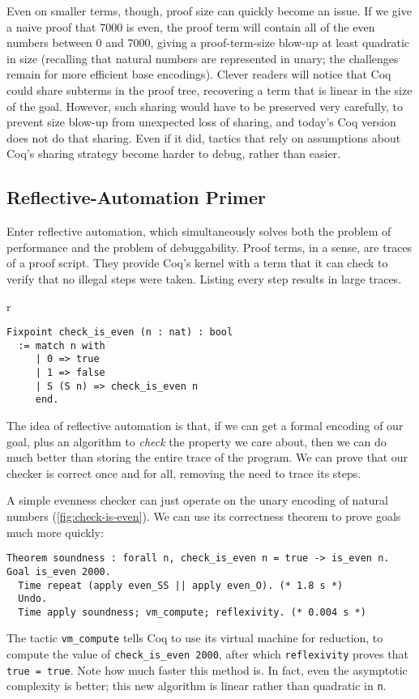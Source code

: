 Even on smaller terms, though, proof size can quickly become an issue.
If we give a naive proof that 7000 is even, the proof term will contain all of the even numbers between 0 and 7000, giving a proof-term-size blow-up at least quadratic in size (recalling that natural numbers are represented in unary; the challenges remain for more efficient base encodings).
Clever readers will notice that Coq could share subterms in the proof tree, recovering a term that is linear in the size of the goal.
However, such sharing would have to be preserved very carefully, to prevent size blow-up from unexpected loss of sharing, and today's Coq version does not do that sharing.
Even if it did, tactics that rely on assumptions about Coq's sharing strategy become harder to debug, rather than easier.

\subsection{Reflective-Automation Primer}\label{sec:evenness}
Enter reflective automation, which simultaneously solves both the problem of performance and the problem of debuggability.
Proof terms, in a sense, are traces of a proof script.
They provide Coq's kernel with a term that it can check to verify that no illegal steps were taken.
Listing every step results in large traces.


\begin{wrapfigure}[9]{r}{}
\begin{verbatim}
Fixpoint check_is_even (n : nat) : bool
  := match n with
     | 0 => true
     | 1 => false
     | S (S n) => check_is_even n
     end.
\end{verbatim}
\caption{Evenness Checking}\label{fig:check-is-even}
\end{wrapfigure}
The idea of reflective automation is that, if we can get a formal encoding of our goal, plus an algorithm to \emph{check} the property we care about, then we can do much better than storing the entire trace of the program.
We can prove that our checker is correct once and for all, removing the need to trace its steps.

A simple evenness checker can just operate on the unary encoding of natural numbers (\autoref{fig:check-is-even}).
We can use its correctness theorem to prove goals much more quickly:
\begin{verbatim}
Theorem soundness : forall n, check_is_even n = true -> is_even n.
Goal is_even 2000.
  Time repeat (apply even_SS || apply even_O). (* 1.8 s *)
  Undo.
  Time apply soundness; vm_compute; reflexivity. (* 0.004 s *)
\end{verbatim}
The tactic \texttt{vm_compute} tells Coq to use its virtual machine for reduction, to compute the value of \texttt{check_is_even 2000}, after which \texttt{reflexivity} proves that \texttt{true = true}.
Note how much faster this method is.
In fact, even the asymptotic complexity is better; this new algorithm is linear rather than quadratic in \texttt{n}.

